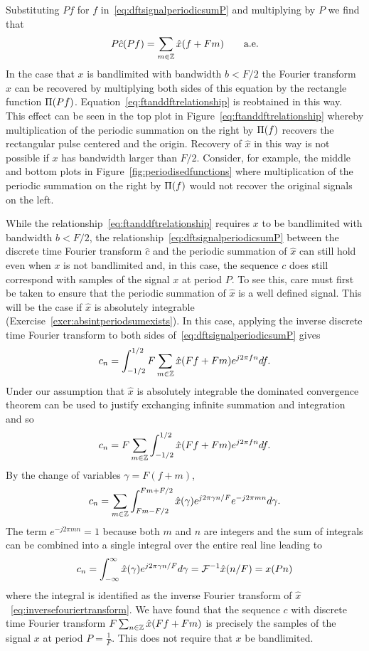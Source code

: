 Substituting $Pf$ for $f$ in~\eqref{eq:dftsignalperiodicsumP} and multiplying by $P$ we find that
\[
P \hat{c}(Pf) = \sum_{m \in {\mathbb Z}} \hat{x}(f + Fm) \qquad \text{a.e.}
\]
In the case that $x$ is bandlimited with bandwidth $b < F/2$ the Fourier transform $\hat{x}$ can be recovered by multiplying both sides of this equation by the rectangle function $\Pi(Pf)$. Equation~\eqref{eq:ftanddftrelationship} is reobtained in this way.  This effect can be seen in the top plot in Figure~\ref{eq:ftanddftrelationship} whereby multiplication of the periodic summation on the right by $\Pi(f)$ recovers the rectangular pulse centered and the origin.  Recovery of $\hat{x}$ in this way is not possible if $x$ has bandwidth larger than $F/2$.  Consider, for example, the middle and bottom plots in Figure~\ref{fig:periodisedfunctions} where multiplication of the periodic summation on the right by $\Pi(f)$ would not recover the original signals on the left.  

While the relationship~\eqref{eq:ftanddftrelationship} requires $x$ to be bandlimited with bandwidth $b < F/2$,  the relationship~\eqref{eq:dftsignalperiodicsumP} between the discrete time Fourier transform $\hat{c}$ and the periodic summation of $\hat{x}$ can still hold even when $x$ is not bandlimited and, in this case, the sequence $c$ does still correspond with samples of the signal $x$ at period $P$.  To see this, care must first be taken to ensure that the periodic summation of $\hat{x}$ is a well defined signal.  This will be the case if $\hat{x}$ is absolutely integrable (Exercise~\ref{exer:absintperiodsumexists}).  In this case, applying the inverse discrete time Fourier transform to both sides of~\eqref{eq:dftsignalperiodicsumP} gives
\[
c_n = \int_{-1/2}^{1/2} F \sum_{m \in {\mathbb Z}} \hat{x}(Ff + Fm)  e^{j 2\pi f n } df.
\]
Under our assumption that $\hat{x}$ is absolutely integrable the dominated convergence theorem can be used to justify exchanging infinite summation and integration~\cite[Section~4.2]{Pinsky_Wavelets_2002} and so
\[
c_n =  F \sum_{m \in {\mathbb Z}} \int_{-1/2}^{1/2} \hat{x}(Ff + Fm)  e^{j 2\pi f n } df.
\]
By the change of variables $\gamma = F(f + m)$,
\[
c_n = \sum_{m\in {\mathbb Z}} \int_{Fm-F/2}^{Fm+F/2} \hat{x}(\gamma)  e^{j 2\pi \gamma n/F}  e^{-j 2\pi m n} d\gamma.
\]
The term $e^{-j 2\pi m n} = 1$ because both $m$ and $n$ are integers and the sum of integrals can be combined into a single integral over the entire real line leading to
\[
c_n = \int_{-\infty}^{\infty} \hat{x}(\gamma)  e^{j 2\pi \gamma n/F} d\gamma = {\mathcal F}^{-1} \hat{x}(n/F) = x(Pn)
\]
where the integral is identified as the inverse Fourier transform of $\hat{x}$~\eqref{eq:inversefouriertransform}.  We have found that the sequence $c$ with discrete time Fourier transform $F \sum_{n\in{\mathbb Z}} \hat{x}(Ff + Fm)$ is precisely the samples of the signal $x$ at period $P = \tfrac{1}{F}$.  This does not require that $x$ be bandlimited.  


